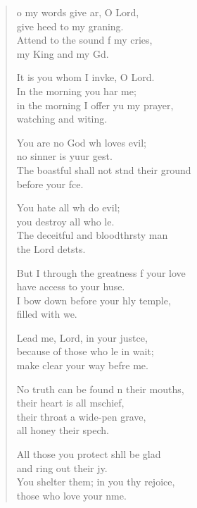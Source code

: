 \settowidth{\versewidth}{you surround him with favour as with a shield.}
\begin{verse}%
  \begin{patverse}
    o my words give ar, O Lord,\Med\\
    give heed to my graning.\\
    Attend to the sound f my cries,\Med\\
    my King and my Gd.

It is you whom I invke, O Lord.\Med\\
    In the morning you har me;\\
in the morning I offer yu my prayer,\Med\\
    watching and witing.

You are no God wh loves evil;\Med\\
    no sinner is yuur gest.\\
The boastful shall not stnd their ground\Med\\
    before your fce.

You hate all wh do evil;\Med\\
    you destroy all who l\pointup{\i}e.\\
The deceitful and bloodth\pointup{\i}rsty man\Med\\
    the Lord detsts.

But I through the greatness f your love\Med\\
    have access to your huse.\\
I bow down before your hly temple,\Med\\
    filled with we.

Lead me, Lord, in your just\pointup{\i}ce,\Flex\\
    because of those who l\pointup{\i}e in wait;\Med\\
    make clear your way befre me.

No truth can be found \pointup{\i}n their mouths,\Med\\
    their heart is all m\pointup{\i}schief,\\
their throat a wide-pen grave,\Med\\
    all honey their spech.

All those you protect shll be glad\Med\\
    and ring out their jy.\\
You shelter them; in you thy rejoice,\Med\\
    those who love your nme.


\end{patverse}
\end{verse}
